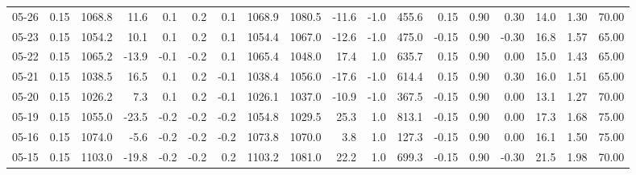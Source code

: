 \begin{threeparttable}
{\begin{tabular}{lrrrrrrrrrrrrrrrrr}
  05-26 &     0.15 & 1068.8 &              11.6 &               0.1 &                0.2 &                0.1 & 1068.9 & 1080.5 &      -11.6 &                     -1.0 &               455.6 &       0.15 &      0.90 &           0.30 &             14.0 &            1.30 &                  70.00 \\
  05-23 &     0.15 & 1054.2 &              10.1 &               0.1 &                0.2 &                0.1 & 1054.4 & 1067.0 &      -12.6 &                     -1.0 &               475.0 &      -0.15 &      0.90 &          -0.30 &             16.8 &            1.57 &                  65.00 \\
  05-22 &     0.15 & 1065.2 &             -13.9 &              -0.1 &               -0.2 &                0.1 & 1065.4 & 1048.0 &       17.4 &                      1.0 &               635.7 &       0.15 &      0.90 &           0.00 &             15.0 &            1.43 &                  65.00 \\
  05-21 &     0.15 & 1038.5 &              16.5 &               0.1 &                0.2 &               -0.1 & 1038.4 & 1056.0 &      -17.6 &                     -1.0 &               614.4 &       0.15 &      0.90 &           0.30 &             16.0 &            1.51 &                  65.00 \\
  05-20 &     0.15 & 1026.2 &               7.3 &               0.1 &                0.2 &               -0.1 & 1026.1 & 1037.0 &      -10.9 &                     -1.0 &               367.5 &      -0.15 &      0.90 &           0.00 &             13.1 &            1.27 &                  70.00 \\
  05-19 &     0.15 & 1055.0 &             -23.5 &              -0.2 &               -0.2 &               -0.2 & 1054.8 & 1029.5 &       25.3 &                      1.0 &               813.1 &      -0.15 &      0.90 &           0.00 &             17.3 &            1.68 &                  75.00 \\
  05-16 &     0.15 & 1074.0 &              -5.6 &              -0.2 &               -0.2 &               -0.2 & 1073.8 & 1070.0 &        3.8 &                      1.0 &               127.3 &      -0.15 &      0.90 &           0.00 &             16.1 &            1.50 &                  75.00 \\
  05-15 &     0.15 & 1103.0 &             -19.8 &              -0.2 &               -0.2 &                0.2 & 1103.2 & 1081.0 &       22.2 &                      1.0 &               699.3 &      -0.15 &      0.90 &          -0.30 &             21.5 &            1.98 &                  70.00 \\

\end{tabular}}
\end{threeparttable}
